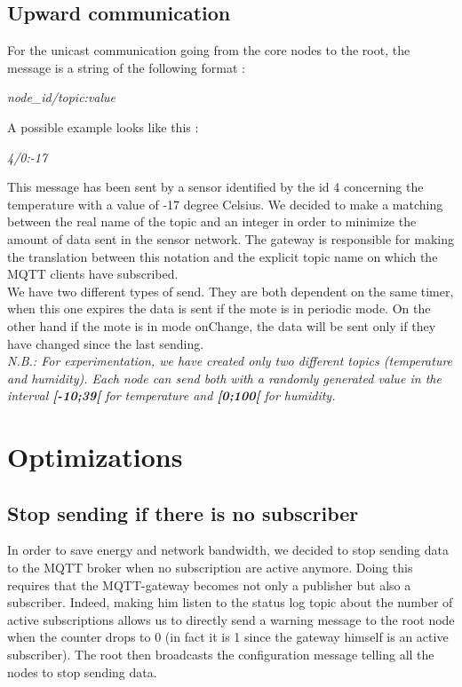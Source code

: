 \documentclass{article}
\begin{document}
\subsection{Upward communication}

For the unicast communication going from the core nodes to the root, the message is a string of the following format : \\
\begin{center}
\centerline{\textit{node\_id/topic:value}}
\end{center}
A possible example looks like this : \\
\begin{center}
\centerline{\textit{4/0:-17}}
\end{center}
This message has been sent by a sensor identified by the id 4 concerning the temperature with a value of -17 degree Celsius. We decided to make a matching between the real name of the topic and an integer in order to minimize the amount of data sent in the sensor network. The gateway is responsible for making the translation between this notation and the explicit topic name on which the MQTT clients have subscribed. \\
We have two different types of send. They are both dependent on the same timer, when this one expires the data is sent if the mote is in periodic mode. On the other hand if the mote is in mode onChange, the data will be sent only if they have changed since the last sending.
\\
\textit{N.B.: For experimentation, we have created only two different topics (temperature and humidity). Each node can send both with a randomly generated value in the interval \textbf{[-10;39[} for temperature and \textbf{[0;100[} for humidity.}

\section{Optimizations}

\subsection{Stop sending if there is no subscriber}

In order to save energy and network bandwidth, we decided to stop sending data to the MQTT broker when no subscription are active anymore. Doing this requires that the MQTT-gateway becomes not only a publisher but also a subscriber. Indeed, making him listen to the status log topic about the number of active subscriptions allows us to directly send a warning message to the root node when the counter drops to 0 (in fact it is 1 since the gateway himself is an active subscriber). The root then broadcasts the configuration message telling all the nodes to stop sending data.
\end{document}
